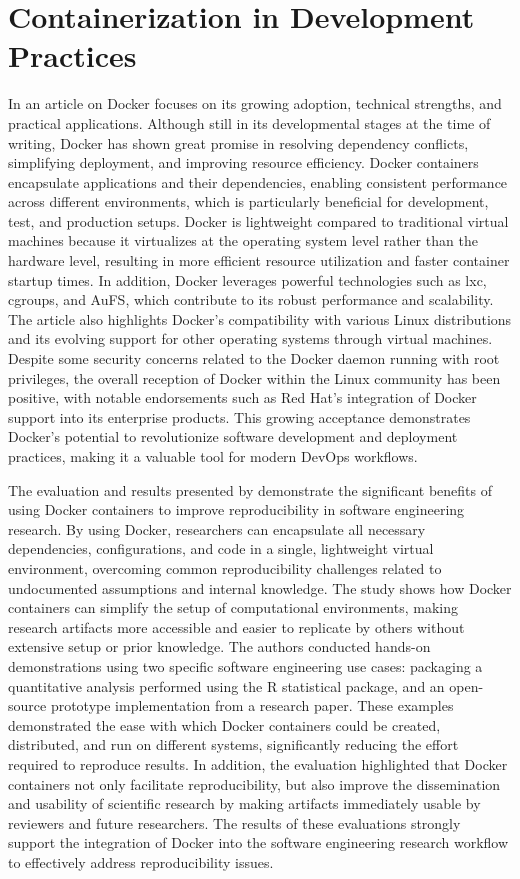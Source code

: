 \section{Containerization in Development Practices}

In an article on Docker \citet{merkelDockerLightweightLinux2014} focuses on its growing adoption, technical strengths, and practical applications. Although still in its developmental stages at the time of writing, Docker has shown great promise in resolving dependency conflicts, simplifying deployment, and improving resource efficiency.
Docker containers encapsulate applications and their dependencies, enabling consistent performance across different environments, which is particularly beneficial for development, test, and production setups.
Docker is lightweight compared to traditional virtual machines because it virtualizes at the operating system level rather than the hardware level, resulting in more efficient resource utilization and faster container startup times.
In addition, Docker leverages powerful technologies such as \ac{lxc}, cgroups, and AuFS, which contribute to its robust performance and scalability.
The article also highlights Docker's compatibility with various Linux distributions and its evolving support for other operating systems through virtual machines.
Despite some security concerns related to the Docker daemon running with root privileges, the overall reception of Docker within the Linux community has been positive, with notable endorsements such as Red Hat's integration of Docker support into its enterprise products.
This growing acceptance demonstrates Docker's potential to revolutionize software development and deployment practices, making it a valuable tool for modern DevOps workflows.

The evaluation and results presented by \citet{citoUsingDockerContainers2016} demonstrate the significant benefits of using Docker containers to improve reproducibility in software engineering research.
By using Docker, researchers can encapsulate all necessary dependencies, configurations, and code in a single, lightweight virtual environment, overcoming common reproducibility challenges related to undocumented assumptions and internal knowledge.
The study shows how Docker containers can simplify the setup of computational environments, making research artifacts more accessible and easier to replicate by others without extensive setup or prior knowledge.
The authors conducted hands-on demonstrations using two specific software engineering use cases: packaging a quantitative analysis performed using the R statistical package, and an open-source prototype implementation from a research paper.
These examples demonstrated the ease with which Docker containers could be created, distributed, and run on different systems, significantly reducing the effort required to reproduce results.
In addition, the evaluation highlighted that Docker containers not only facilitate reproducibility, but also improve the dissemination and usability of scientific research by making artifacts immediately usable by reviewers and future researchers.
The results of these evaluations strongly support the integration of Docker into the software engineering research workflow to effectively address reproducibility issues.

